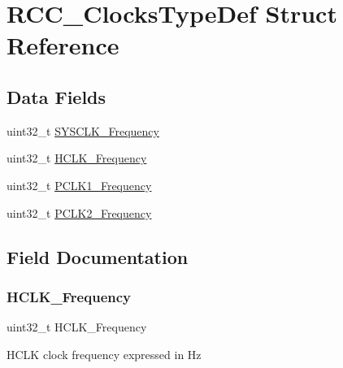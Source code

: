 \hypertarget{struct_r_c_c___clocks_type_def}{}\section{R\+C\+C\+\_\+\+Clocks\+Type\+Def Struct Reference}
\label{struct_r_c_c___clocks_type_def}
\subsection*{Data Fields}
\begin{DoxyCompactItemize}
\item 
uint32\+\_\+t \mbox{\hyperlink{struct_r_c_c___clocks_type_def_a48b5f04759728e39921969e75c4899e8}{S\+Y\+S\+C\+L\+K\+\_\+\+Frequency}}
\item 
uint32\+\_\+t \mbox{\hyperlink{struct_r_c_c___clocks_type_def_a5f9bf60f522a160aa7a878acf92ce129}{H\+C\+L\+K\+\_\+\+Frequency}}
\item 
uint32\+\_\+t \mbox{\hyperlink{struct_r_c_c___clocks_type_def_a9045b24904bde572d479e85c6d2801f6}{P\+C\+L\+K1\+\_\+\+Frequency}}
\item 
uint32\+\_\+t \mbox{\hyperlink{struct_r_c_c___clocks_type_def_a45ada83b2d388a60ed994451f260f389}{P\+C\+L\+K2\+\_\+\+Frequency}}
\end{DoxyCompactItemize}


\subsection{Field Documentation}
\mbox{\label{struct_r_c_c___clocks_type_def_a5f9bf60f522a160aa7a878acf92ce129}} 
\subsubsection{\texorpdfstring{H\+C\+L\+K\+\_\+\+Frequency}{HCLK\_Frequency}}
{\footnotesize\ttfamily uint32\+\_\+t H\+C\+L\+K\+\_\+\+Frequency}

H\+C\+LK clock frequency expressed in Hz \mbox{\label{struct_r_c_c___clocks_type_def_a9045b24904bde572d479e85c6d2801f6}} 
